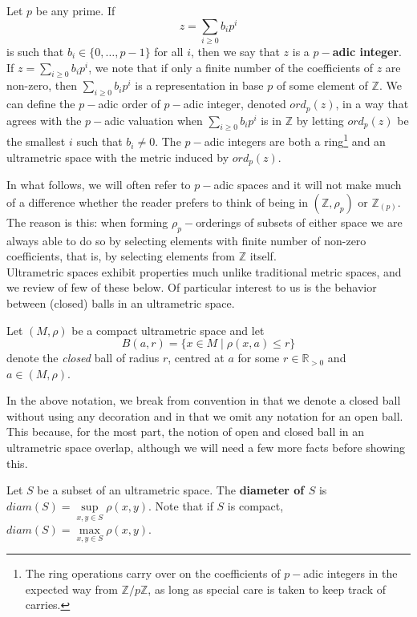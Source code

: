 \begin{example}
Let $p$ be any prime. If 
\[z = \sum_{i \geq 0} b_ip^i\]
is such that $b_i \in \{0,\ldots,p-1\}$ for all $i$, then we say that $z$ is a \textbf{$p-$adic integer}. If $z = \sum_{i \geq 0} b_ip^i$, we note that if only a finite number of the coefficients of $z$ are non-zero, then $\sum_{i \geq 0} b_ip^i$ is a representation in base $p$ of some element of $\mathbb{Z}$. We can define the $p-$adic order of $p-$adic integer, denoted $ord_p(z)$, in a way that agrees with the $p-$adic valuation when $\sum_{i \geq 0} b_ip^i$ is in $\mathbb{Z}$ by letting $ord_p(z)$ be the smallest $i$ such that $b_i \neq 0$. The $p-$adic integers are both a ring\footnote{The ring operations carry over on the coefficients of $p-$adic integers in the expected way from $\mathbb{Z}/p\mathbb{Z}$, as long as special care is taken to keep track of carries.} and an ultrametric space with the metric induced by $ord_p(z)$.
\end{example} 

In what follows, we will often refer to $p-$adic spaces and it will not make much of a difference whether the reader prefers to think of being in $(\mathbb{Z}, \rho_p)$ or $\mathbb{Z}_{(p)}$. The reason is this: when forming $\rho_p-$orderings of subsets of either space we are always able to do so by selecting elements with finite number of non-zero coefficients, that is, by selecting elements from $\mathbb{Z}$ itself. \\

Ultrametric spaces exhibit properties much unlike traditional metric spaces, and we review of few of these below. Of particular interest to us is the behavior between (closed) balls in an ultrametric space.\\

\begin{notation*}
	Let $(M, \rho)$ be a compact ultrametric space and let \[B(a, r)=\{x \in M \mid \rho(x,a) \leq r\}\] denote the \textit{closed} ball of radius $r$, centred at $a$ for some $r \in \mathbb{R}_{> 0}$ and $a \in (M,\rho)$.
\end{notation*} 
In the above notation, we break from  convention in that we denote a closed ball without using any decoration and in that we omit any notation for an open ball. This because, for the most part, the notion of open and closed ball in an ultrametric space overlap, although we will need a few more facts before showing this.\\

\begin{definition}
Let $S$ be a subset of an ultrametric space. The \textbf{diameter of $S$} is $diam(S) = \sup\limits_{x,y\in S}\rho(x,y)$. Note that if $S$ is compact, $diam(S) = \max\limits_{x,y\in S}\rho(x,y)$.
\end{definition}

